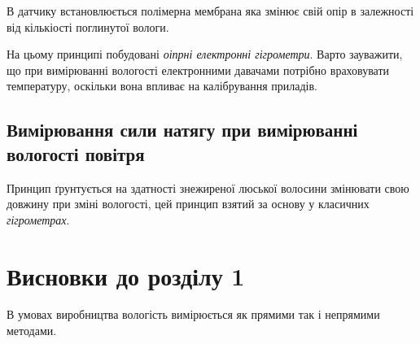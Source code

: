 В датчику встановлюється полімерна мембрана яка змінює свій опір в залежності від кількіості
поглинутої вологи.

На цьому принципі побудовані \textit{оіпрні електронні гігрометри}. Варто зауважити, що при
вимірюванні вологості електронними давачами потрібно враховувати температуру, оскільки вона впливає
на калібрування приладів.

\subsection{Вимірювання сили натягу при вимірюванні вологості повітря}

Принцип ґрунтується на здатності знежиреної люської волосини змінювати свою довжину при зміні
вологості, цей принцип взятий за основу у класичних \textit{гігрометрах}.

\section*{Висновки до розділу 1}

В умовах виробництва вологість вимірюється як прямими так і непрямими методами.